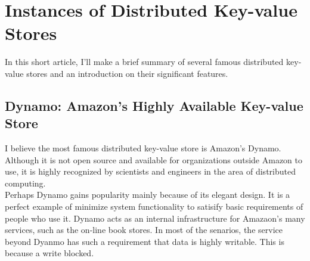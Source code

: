 \documentclass{article}
\begin{document}
\section{Instances of Distributed Key-value Stores}
In this short article, I'll make a brief summary of several famous distributed
key-value stores and an introduction on their significant features.

\subsection{Dynamo: Amazon's Highly Available Key-value Store}
I believe the most famous distributed key-value store is Amazon's Dynamo.
Although it is not open source and available for organizations outside Amazon
to use, it is highly recognized by scientists and engineers in the area of
distributed computing.\\
Perhaps Dynamo gains popularity mainly because of its elegant design. It is a
perfect example of minimize system functionality to satisify basic
requirements of people who use it. Dynamo acts as an internal infrastructure
for Amazaon's many services, such as the on-line book stores. In most of the
senarios, the service beyond Dyanmo has such a requirement that data is highly
writable. This is because a write blocked. 
\end{document}
